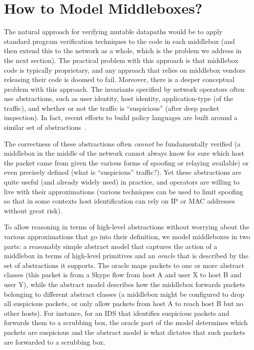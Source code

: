 \section{How to Model Middleboxes?}
\label{sec:mbmodel}
The natural approach for verifying mutable datapaths would be to apply standard program verification techniques to the code in each middlebox (and then extend this to the network as a whole, which is the problem we address in the next section). The practical problem with this approach is that middlebox code is typically proprietary, and any approach that relies on middlebox vendors releasing their code is doomed to fail.
Moreover, there is a deeper conceptual problem with this approach. The invariants specified by network operators often use abstractions, such as user identity, host identity, application-type (of the traffic), and whether or not the traffic is ``suspicious'' (\eg after deep packet inspection). In fact, recent efforts to build policy languages are built around a similar set of abstractions~\cite{congress}.

The correctness of these abstractions often {\em cannot} be fundamentally verified (\eg a middlebox in the middle of the network cannot always know for sure which host the packet came from given the various forms of spoofing or relaying available) or even precisely defined (\eg what is ``suspicious'' traffic?). Yet these abstractions are quite useful (and already widely used) in practice, and operators are willing to live with their approximations (\eg various techniques can be used to limit spoofing so that in some contexts host identification can rely on IP or MAC addresses without great risk).


To allow reasoning in terms of high-level abstractions without worrying about the various approximations that go into their definition, we model middleboxes in two parts: a reasonably simple abstract model that captures the action of a middlebox in terms of high-level primitives and an {\em oracle} that is described by the set of abstractions it supports. The oracle maps packets to one or more abstract classes (\eg this packet is from a Skype flow from host A and user X to host B and user Y), while the abstract model describes how the middlebox forwards packets belonging to different abstract classes (\eg a middlebox might be configured to drop all suspicious packets, or only allow packets from host A to reach host B but no other hosts). For instance, for an IDS that identifies suspicious packets and forwards them to a scrubbing box, the oracle part of the model determines which packets are suspicious and the abstract model is what dictates that such packets are forwarded to a scrubbing box.


